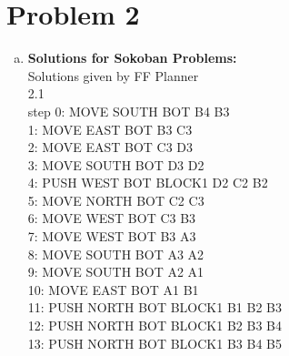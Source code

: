 \documentclass[]{article}
\begin{document}
\section{Problem 2}
	\begin{enumerate}[(a)]
		\item \textbf{Solutions for Sokoban Problems:}\\
		Solutions given by FF Planner\\
		
		2.1\\
		step    0: MOVE SOUTH BOT B4 B3\\
		        1: MOVE EAST BOT B3 C3\\
		        2: MOVE EAST BOT C3 D3\\
		        3: MOVE SOUTH BOT D3 D2\\
		        4: PUSH WEST BOT BLOCK1 D2 C2 B2\\
		        5: MOVE NORTH BOT C2 C3\\
		        6: MOVE WEST BOT C3 B3\\
		        7: MOVE WEST BOT B3 A3\\
		        8: MOVE SOUTH BOT A3 A2\\
		        9: MOVE SOUTH BOT A2 A1\\
		       10: MOVE EAST BOT A1 B1\\
		       11: PUSH NORTH BOT BLOCK1 B1 B2 B3\\
		       12: PUSH NORTH BOT BLOCK1 B2 B3 B4\\
		       13: PUSH NORTH BOT BLOCK1 B3 B4 B5\\
		

\end{enumerate}
\end{document}
